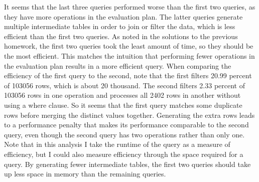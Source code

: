 \documentclass[12pt]{article}
\begin{document}
\begin{enumerate}
        \begin{center}
                \hspace*{-7cm}
                \hspace*{-7cm}
        \end{center}
\end{enumerate}

It seems that the last three queries performed worse than the first two queries, as they have more operations in the evaluation plan. The latter queries generate
multiple intermediate tables in order to join or filter the data, which is less efficient than the first two queries. As noted in the
solutions to the previous homework, the first two queries took the least amount of time, so they should be the most efficient. This matches the intuition
that performing fewer operations in the evaluation plan results in a more efficient query. When comparing the efficiency of the first query to the second,
note that the first filters 20.99 percent of 103056 rows, which is about 20 thousand. The second filters 2.33 percent of 103056 rows in one operation and
processes all 2402 rows in another without using a where clause. So it seems that the first query matches some duplicate rows before merging the distinct values
together. Generating the extra rows leads to a performance penalty that makes its performance comparable to the second query, even though the second query has
two operations rather than only one. Note that in this analysis I take the runtime of the query as a measure of efficiency, but I could also measure efficiency
through the space required for a query. By generating fewer intermediate tables, the first two queries should take up less space in memory than the remaining queries.
\end{document}
